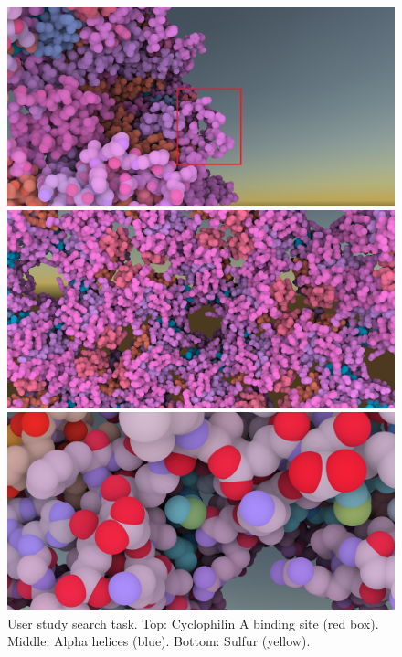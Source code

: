 \documentclass{article}
\begin{document}
	\begin{figure}[t]
		\centering
		\includegraphics[width=0.95\linewidth,keepaspectratio]{supplementaryMaterial/bindingsite} 
		
		\vspace{0.1cm}
		
		\includegraphics[width=0.95\linewidth,keepaspectratio]{supplementaryMaterial/hexamerhelices} 
		
		\vspace{0.1cm}
		
		\includegraphics[width=0.95\linewidth,keepaspectratio]{supplementaryMaterial/sulfur} 
		\caption{User study search task. Top: Cyclophilin A binding site (red box). Middle: Alpha helices (blue). Bottom: Sulfur (yellow).}
	\end{figure}
	
	
	
	
\end{document}
